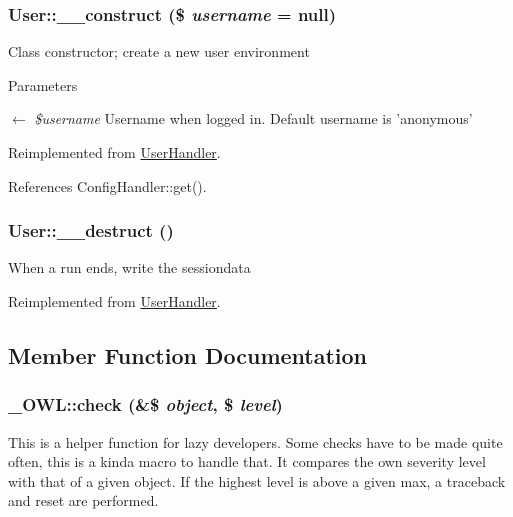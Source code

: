 \subsubsection[{\_\-\_\-construct}]{\setlength{\rightskip}{0pt plus 5cm}User::\_\-\_\-construct (\$ {\em username} = {\ttfamily null})}\label{classUser_ab8a717f17626301cc8b7815a43ea5b5b}
Class constructor; create a new user environment


\begin{DoxyParams}{Parameters}
\item[\mbox{$\leftarrow$} {\em \$username}]Username when logged in. Default username is 'anonymous' \end{DoxyParams}


Reimplemented from \hyperlink{classUserHandler_a624054e9693139a3fe5af0ef3b757f04}{UserHandler}.



References ConfigHandler::get().

\subsubsection[{\_\-\_\-destruct}]{\setlength{\rightskip}{0pt plus 5cm}User::\_\-\_\-destruct ()}\label{classUser_accd20149a7414612c1505e022eb63ffc}
When a run ends, write the sessiondata 

Reimplemented from \hyperlink{classUserHandler_a3e1f6381ed79caf6e1a255fb0a9cc386}{UserHandler}.



\subsection{Member Function Documentation}
\subsubsection[{check}]{\setlength{\rightskip}{0pt plus 5cm}\_\-OWL::check (\&\$ {\em object}, \/  \$ {\em level})}\label{class__OWL_ad6f4f6946f40199dd0333cf219fa500e}
This is a helper function for lazy developers. Some checks have to be made quite often, this is a kinda macro to handle that. It compares the own severity level with that of a given object. If the highest level is above a given max, a traceback and reset are performed.


